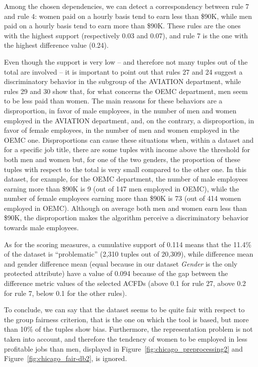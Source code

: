 Among the chosen dependencies, we can detect a correspondency between rule 7 and rule 4: women paid on a hourly basis tend to earn less than \$90K, while men paid on a hourly basis tend to earn more than \$90K. These rules are the ones with the highest support (respectively 0.03 and 0.07), and rule 7 is the one with the highest difference value (0.24).

Even though the support is very low -- and therefore not many tuples out of the total are involved -- it is important to point out that rules 27 and 24 suggest a discriminatory behavior in the subgroup of the AVIATION department, while rules 29 and 30 show that, for what concerns the OEMC department, men seem to be less paid than women. The main reasons for these behaviors are a disproportion, in favor of male employees, in the number of men and women employed in the AVIATION department, and, on the contrary, a disproportion, in favor of female employees, in the number of men and women employed in the OEMC one. Disproportions can cause these situations when, within a dataset and for a specific job title, there are some tuples with income above the threshold for both men and women but, for one of the two genders, the proportion of these tuples with respect to the total is very small compared to the other one. In this dataset, for example, for the OEMC department, the number of male employees earning more than \$90K is 9 (out of 147 men employed in OEMC), while the number of female employees earning more than \$90K is 73 (out of 414 women employed in OEMC). Although on average both men and women earn less than \$90K, the disproportion makes the algorithm perceive a discriminatory behavior towards male employees.

As for the scoring measures, a cumulative support of 0.114 means that the 11.4\% of the dataset is ``problematic'' (2,310 tuples out of 20,309), while difference mean and gender difference mean (equal because in our dataset \textit{Gender} is the only protected attribute) have a value of 0.094 because of the gap between the difference metric values of the selected ACFDs (above 0.1 for rule 27, above 0.2 for rule 7, below 0.1 for the other rules).

To conclude, we can say that the dataset seems to be quite fair with respect to the group fairness criterion, that is the one on which the tool is based, but more than 10\% of the tuples show bias. Furthermore, the representation problem is not taken into account, and therefore the tendency of women to be employed in less profitable jobs than men, displayed in Figure~\ref{fig:chicago_preprocessing2} and Figure~\ref{fig:chicago_fair-db2}, is ignored.


